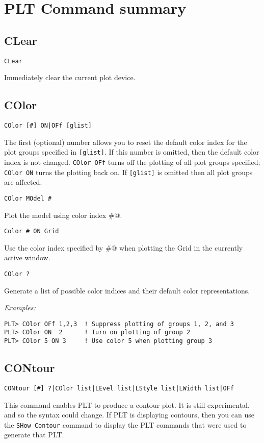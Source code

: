 \chapter{PLT Command summary}
\label{pltcommands}

\section*{CLear}
\begin{verbatim}
CLear
\end{verbatim}
   Immediately clear the current plot device.

\section*{COlor}
\begin{verbatim}
COlor [#] ON|OFf [glist]
\end{verbatim}
   The first (optional) number allows you to reset the default color
index for the plot groups specified in {\tt [glist]}.  If this number is
omitted, then the default color index is not changed.  {\tt COlor~OFf}
turns off the plotting of all plot groups specified; {\tt COlor~ON} turns
the plotting back on.  If {\tt [glist]} is omitted then all plot groups
are affected.

\medskip
\begin{verbatim}
COlor MOdel #
\end{verbatim}
   Plot the model using color index \verb@#@.

\medskip
\begin{verbatim}
Color # ON Grid
\end{verbatim}
   Use the color index specified by \verb@#@ when plotting the Grid in the
currently active window.

\medskip
\begin{verbatim}
COlor ?
\end{verbatim}
   Generate a list of possible color indices and their default color
representations.

\medskip\noindent
{\em Examples:}
\begin{verbatim}
PLT> COlor OFf 1,2,3  ! Suppress plotting of groups 1, 2, and 3
PLT> COlor ON  2      ! Turn on plotting of group 2
PLT> COlor 5 ON 3     ! Use color 5 when plotting group 3
\end{verbatim}

\section*{CONtour}
\begin{verbatim}
CONtour [#] ?|COlor list|LEvel list|LStyle list|LWidth list|OFf
\end{verbatim}
   This command enables PLT to produce a contour plot.  It is still
experimental, and so the syntax could change.  If PLT is displaying
contours, then you can use the {\tt SHow~Contour} command to display the
PLT commands that were used to generate that PLT.

